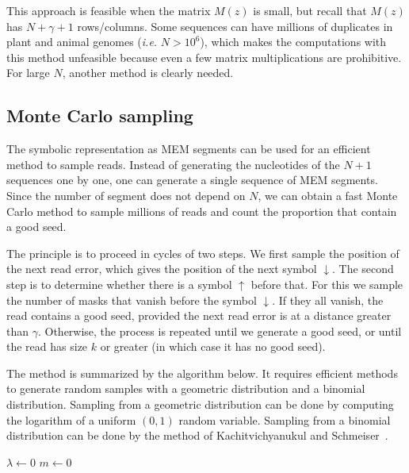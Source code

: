 \documentclass{article}
\begin{document}
This approach is feasible when the matrix $M(z)$ is small, but recall that
$M(z)$ has $N+\gamma+1$ rows/columns. Some sequences can have millions of
duplicates in plant and animal genomes (\textit{i.e.} $N > 10^6$), which
makes the computations with this method unfeasible because even a few
matrix multiplications are prohibitive. For large $N$, another method is
clearly needed.


\subsection{Monte Carlo sampling}
\label{sec:montecarlo}

The symbolic representation as MEM segments can be used for an efficient
method to sample reads. Instead of generating the nucleotides of the $N+1$
sequences one by one, one can generate a single sequence of MEM segments.
Since the number of segment does not depend on $N$, we can obtain a fast
Monte Carlo method to sample millions of reads and count the proportion
that contain a good seed.

The principle is to proceed in cycles of two steps. We first sample the
position of the next read error, which gives the position of the next
symbol $\downarrow$. The second step is to determine whether there is a
symbol $\uparrow$ before that. For this we sample the number of masks that
vanish before the symbol $\downarrow$. If they all vanish, the read
contains a good seed, provided the next read error is at a distance
greater than $\gamma$. Otherwise, the process is repeated until we
generate a good seed, or until the read has size $k$ or greater (in which
case it has no good seed).

The method is summarized by the algorithm below. It requires efficient
methods to generate random samples with a geometric distribution and a
binomial distribution. Sampling from a geometric distribution can be done
by computing the logarithm of a uniform $(0,1)$ random variable. Sampling
from a binomial distribution can be done by the method of
Kachitvichyanukul and Schmeiser~\cite{kachitvichyanukul1988binomial}.

\begin{algorithm}[H]
\label{alg:mcmc}
\SetAlgoLined
{}
  $\lambda \leftarrow 0$ 
  $m \leftarrow 0$ 
\end{algorithm}
\end{document}

